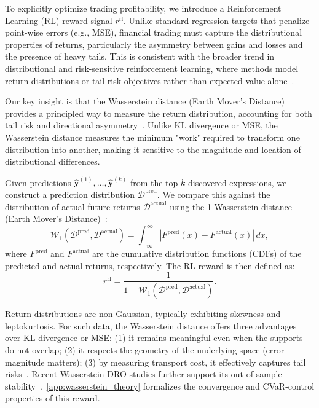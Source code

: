 \documentclass{elektr}
\theoremstyle{corollary}
\theoremstyle{lemma}
\theoremstyle{proposition}
\theoremstyle{axiom}
\theoremstyle{conjecture}
\theoremstyle{example}
\theoremstyle{definition}
\theoremstyle{remark}
\begin{document}
To explicitly optimize trading profitability, we introduce a Reinforcement Learning (RL) reward signal $r^{\text{rl}}$. Unlike standard regression targets that penalize point-wise errors (e.g., MSE), financial trading must capture the distributional properties of returns, particularly the asymmetry between gains and losses and the presence of heavy tails. This is consistent with the broader trend in distributional and risk-sensitive reinforcement learning, where methods model return distributions or tail-risk objectives rather than expected value alone~\cite{chow2015cvar}.

Our key insight is that the Wasserstein distance (Earth Mover's Distance) provides a principled way to measure the return distribution, accounting for both tail risk and directional asymmetry~\cite{villani2009optimal}. Unlike KL divergence or MSE, the Wasserstein distance measures the minimum "work" required to transform one distribution into another, making it sensitive to the magnitude and location of distributional differences.

Given predictions $\hat{\mathbf{y}}^{(1)}, \ldots, \hat{\mathbf{y}}^{(k)}$ from the top-$k$ discovered expressions, we construct a prediction distribution $\mathcal{D}^{\text{pred}}$. We compare this against the distribution of actual future returns $\mathcal{D}^{\text{actual}}$ using the 1-Wasserstein distance (Earth Mover's Distance)~\cite{villani2009optimal}:
\begin{equation}
\mathcal{W}_{1}(\mathcal{D}^{\text{pred}}, \mathcal{D}^{\text{actual}}) = \int_{-\infty}^{\infty} |F^{\text{pred}}(x) - F^{\text{actual}}(x)| \, dx,
\label{eq:wasserstein}
\end{equation}
where $F^{\text{pred}}$ and $F^{\text{actual}}$ are the cumulative distribution functions (CDFs) of the predicted and actual returns, respectively. The RL reward is then defined as:
\begin{equation}
r^{\text{rl}} = \frac{1}{1 + \mathcal{W}_{1}(\mathcal{D}^{\text{pred}}, \mathcal{D}^{\text{actual}})}.
\label{eq:rlreward}
\end{equation}

Return distributions are non-Gaussian, typically exhibiting skewness and leptokurtosis. For such data, the Wasserstein distance offers three advantages over KL divergence or MSE: (1) it remains meaningful even when the supports do not overlap; (2) it respects the geometry of the underlying space (error magnitude matters); (3) by measuring transport cost, it effectively captures tail risks~\cite{villani2009optimal}. Recent Wasserstein DRO studies further support its out-of-sample stability~\cite{pesenti2023pOrtfolio}.~\ref{app:wasserstein_theory} formalizes the convergence and CVaR-control properties of this reward.
\end{document}
